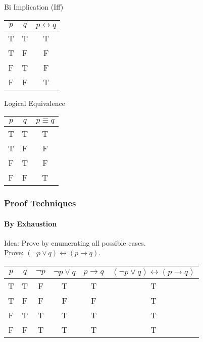 \documentclass{beamer}
\begin{document}
\begin{frame}[fragile]
\begin{minipage}{0.32\textwidth}
  \end{minipage}
  \begin{minipage}{0.32\textwidth}
    $\;$ \\
    Bi Implication (Iff) \\
    \begin{tabular}{| c | c | c |}
    \hline
    $p$ & $q$ & $p \leftrightarrow q$ \\
    \hline
    T & T & T \\
    T & F & F \\
    F & T & F \\
    F & F & T \\
    \hline
    \end{tabular}
  \end{minipage}
  \begin{minipage}{0.32\textwidth}
    $\;$ \\
    Logical Equivalence \\
    \begin{tabular}{| c | c | c |}
    \hline
    $p$ & $q$ & $p \equiv q$ \\
    \hline
    T & T & T \\
    T & F & F \\
    F & T & F \\
    F & F & T \\
    \hline
    \end{tabular}
  \end{minipage}
\end{frame}

\begin{frame}[fragile]
  \frametitle{Proof Techniques}
  \framesubtitle{By Exhaustion}
  Idea: Prove by enumerating all possible cases. \\
  Prove: $(\lnot p \lor q) \leftrightarrow (p \rightarrow q)$.
  \begin{tabular}{| c | c | c | c | c | c |}
  \hline
  $p$ & $q$ & $\lnot p$ & $ \lnot p \lor q$ & $p \rightarrow q$
      & $(\lnot p \lor q) \leftrightarrow (p \rightarrow q)$ \\
  \hline
  T & T & F & T & T & T \\
  T & F & F & F & F & T \\
  F & T & T & T & T & T \\
  F & F & T & T & T & T \\
  \hline
  \end{tabular}
\end{frame}
\end{document}
